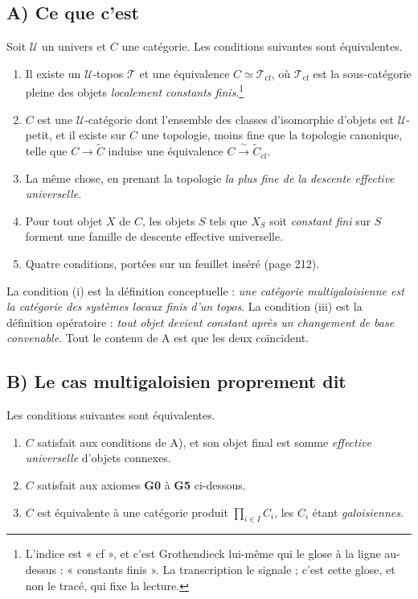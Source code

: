 \documentclass[11pt,a4paper]{article}
\begin{document}
\subsection*{A) Ce que c'est}

Soit $\mathcal{U}$ un univers et $C$ une catégorie. Les conditions suivantes
sont équivalentes.

\begin{enumerate}
  \item[(i)] Il existe un $\mathcal{U}$-topos $\mathcal{T}$ et une équivalence
    $C \simeq \mathcal{T}_{\mathrm{cf}}$, où $\mathcal{T}_{\mathrm{cf}}$ est la
    sous-catégorie pleine des objets \emph{localement constants
    finis}.\footnote{L'indice est « cf », et c'est Grothendieck lui-même qui le
    glose à la ligne au-dessus : « constants finis ». La transcription le
    signale ; c'est cette glose, et non le tracé, qui fixe la lecture.}
  \item[(ii)] $C$ est une $\mathcal{U}$-catégorie dont l'ensemble des classes
    d'isomorphie d'objets est $\mathcal{U}$-petit, et il existe sur $C$ une
    topologie, moins fine que la topologie canonique, telle que
    $C \to \tilde{C}$ induise une équivalence
    $C \xrightarrow{\ \sim\ } \tilde{C}_{\mathrm{cf}}$.
  \item[(ii bis)] La même chose, en prenant la topologie \emph{la plus fine de
    la descente effective universelle}.
  \item[(iii)] Pour tout objet $X$ de $C$, les objets $S$ tels que $X_{S}$ soit
    \emph{constant fini} sur $S$ forment une famille de descente effective
    universelle.
  \item[(iv)] Quatre conditions, portées sur un feuillet inséré (page 212).
\end{enumerate}

La condition (i) est la définition conceptuelle : \emph{une catégorie
multigaloisienne est la catégorie des systèmes locaux finis d'un topos}. La
condition (iii) est la définition opératoire : \emph{tout objet devient
constant après un changement de base convenable}. Tout le contenu de A est
que les deux coïncident.

\subsection*{B) Le cas multigaloisien proprement dit}

Les conditions suivantes sont équivalentes.

\begin{enumerate}
  \item[(i)] $C$ satisfait aux conditions de A), et son objet final est somme
    \emph{effective universelle} d'objets connexes.
  \item[(ii)] $C$ satisfait aux axiomes \textbf{G0} à \textbf{G5} ci-dessous.
  \item[(iii)] $C$ est équivalente à une catégorie produit
    $\prod_{i \in I} C_{i}$, les $C_{i}$ étant \emph{galoisiennes}.
\end{enumerate}
\end{document}
